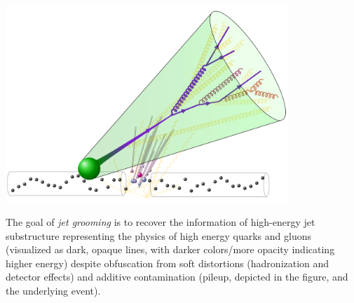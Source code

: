 \begin{sourcefigure}[t!]
    \centering
    \includegraphics[width=0.8\textwidth]{figures/picturebook/pu-jet}

    \caption[A visualization of the low-energy contamination within jets, whose removal is the goal of jet grooming.]{
        The goal of \emph{jet grooming} is to recover the information of high-energy jet substructure representing the physics of high energy quarks and gluons (visualized as dark, opaque lines, with darker colors/more opacity indicating higher energy) despite obfuscation from soft distortions (hadronization and detector effects) and additive contamination (pileup, depicted in the figure, and the underlying event).
    }

    \label{fig:picturebook_substructure}
\end{sourcefigure}


